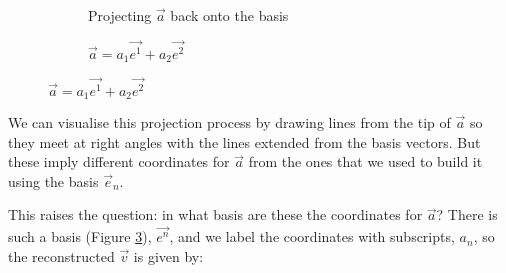 \begin{figure}[h]
    \caption{Projecting a vector onto a non-orthogonal basis}
    \begin{subfigure}{0.5\textwidth}
        \centering
    \caption{Projecting $\vec{a}$ back onto the basis} \label{fig:vectors-non-orth-3}
    \end{subfigure}
    \begin{subfigure}{0.5\textwidth}
        \centering
        \caption{$\vec{a} = a_1 \vec{e^1} + a_2 \vec{e^2}$} \label{fig:vectors-non-orth-4}
    \end{subfigure}
\end{figure}

We can visualise this projection process by drawing lines from the tip of $\vec{a}$ so they meet at right angles with the lines extended from the basis vectors. But these imply different coordinates for $\vec{a}$ from the ones that we used to build it using the basis $\vec{e}_n$.

This raises the question: in what basis are these the coordinates for $\vec{a}$? There is such a basis (Figure \ref{fig:vectors-non-orth-4}), $\vec{e^n}$, and we label the coordinates with subscripts, $a_n$, so the reconstructed $\vec{v}$ is given by:


